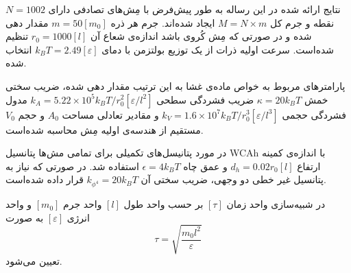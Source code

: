نتایج ارائه شده در این رساله  به طور پیش‌فرض با مِش‌های تصادفی دارای 
$N=1002$
نقطه و جرم کل
$M=N\times m$
ایجاد شده‌اند. جرم هر ذره 
$m=50 [m_0]$
مقدار دهی شده و در صورتی که مِش کُروی باشد اندازه‌ی شعاع آن 
$r_0=1000 [l]$
تنظیم شده‌است. سرعت اولیه ذرات از یک توزیع بولتزمن با دمای 
$k_BT=2.49 [\varepsilon]$
انتخاب شده.

پارامترهای مربوط به خواص ماده‌ی غشا به این ترتیب مقدار دهی شده، ضریب سختی خمش 
$\kappa =20k_BT$
ضریب فشردگی سطحی
$k_A=5.22\times10^{5}k_BT/r_0^2 [\varepsilon/l^2]$
مدول فشردگی حجمی
$k_V=1.6\times10^7k_BT/r_0^3 [\varepsilon/l^3]$
و مقادیر تعادلی مساحت
$A_0$
و حجم
$V_0$
مستقیم از هندسه‌ی اولیه مِش محاسبه‌ شده‌است. 

در مورد پتانیسل‌های تکمیلی برای تمامی مش‌ها پتانسیل 
WCAh
با اندازه‌ی کمینه ارتفاع 
$d_h=0.02r_0 [l]$
و عمق چاه
$\epsilon=4k_BT$
استفاده شد. در صورتی که نیاز به پتانسیل غیر خطی دو وجهی، ضریب سختی آن 
$k_{\phi^4}=20k_BT$
قرار داده شده‌است.

در شبیه‌سازی واحد زمان
$[\tau]$
بر حسب واحد طول 
$[l]$
واحد جرم
$[m_0]$
و واحد انرژی
$[\varepsilon]$
به صورت
\begin{equation}
\tau =\sqrt{\frac{m_0l^2}{\varepsilon}}
\end{equation}
تعیین می‌شود.









